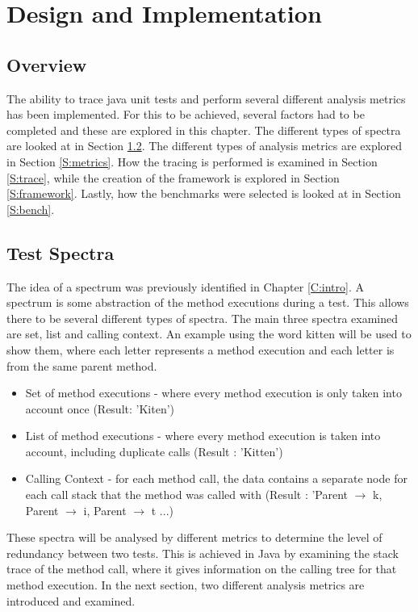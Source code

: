 \chapter{Design and Implementation}\label{C:workdone}

\section{Overview}

The ability to trace java unit tests and perform several different analysis metrics has been implemented. For this to be achieved, several factors had to be completed and these are explored in this chapter. The different types of spectra are looked at in Section \ref{S:spectra}. The different types of analysis metrics are explored in Section \ref{S:metrics}. How the tracing is performed is examined in Section \ref{S:trace}, while the creation of the framework is explored in Section \ref{S:framework}. Lastly, how the benchmarks were selected is looked at in Section \ref{S:bench}.

\section{Test Spectra}
\label{S:spectra}

The idea of a spectrum was previously identified in Chapter \ref{C:intro}. A spectrum is some abstraction of the method executions during a test. This allows there to be several different types of spectra. The main three spectra examined are set, list and calling context. An example using the word kitten will be used to show them, where each letter represents a method execution and each letter is from the same parent method.

\begin{itemize}
\item Set of method executions - where every method execution is only taken into account once (Result: 'Kiten')
\item List of method executions - where every method execution is taken into account, including duplicate calls (Result : 'Kitten')
\item Calling Context - for each method call, the data contains a separate node for each call stack that the method was called with \cite{callingcontext} (Result : 'Parent $\rightarrow$ k, Parent $\rightarrow$ i, Parent $\rightarrow$ t ...) 
\end{itemize}
These spectra will be analysed by different metrics to determine the level of redundancy between two tests. This is achieved in Java by examining the stack trace of the method call, where it gives information on the calling tree for that method execution. In the next section, two different analysis metrics are introduced and examined.

